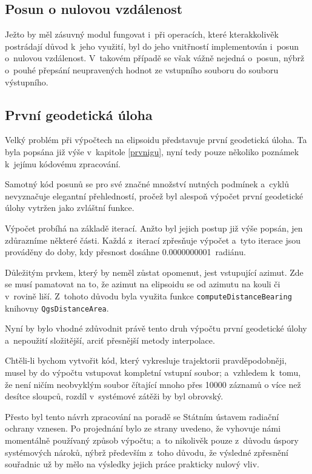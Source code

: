 \subsection{Posun o nulovou vzdálenost}
\label{nulovavzdalenost}

Ježto by měl zásuvný modul fungovat i~při
operacích, které kterakkolivěk postrádají důvod k~jeho využití, byl do jeho
vnitřností implementován i~posun o~nulovou vzdálenost.
V~takovém případě se však vážně nejedná o~posun, nýbrž o~pouhé přepsání
neupravených hodnot ze vstupního souboru do souboru výstupního. 

\subsection{První geodetická úloha}
\label{prvniguplugin}

Velký problém při výpočtech na elipsoidu představuje první geodetická úloha. Ta byla popsána
již výše v~kapitole \ref{prvnigu}, nyní tedy pouze několiko poznámek k~jejímu kódovému zpracování. 

Samotný kód posunů se pro své značné množství nutných podmínek a~cyklů nevyznačuje
elegantní přehledností, pročež byl alespoň výpočet první geodetické úlohy vytržen jako zvláštní funkce.

Výpočet probíhá na základě iterací. Anžto byl jejich postup již výše popsán, jen zdůrazníme
některé části. Každá z~iterací zpřesňuje výpočet a~tyto iterace jsou prováděny do doby,
kdy přesnost dosáhne 0.0000000001~radiánu. 

Důležitým prvkem, který by neměl zůstat opomenut, jest vstupující azimut. Zde se musí pamatovat
na to, že azimut na elipsoidu se od azimutu na kouli či v~ro\-vině liší. Z~tohoto
důvodu byla využita funkce {\tt computeDistanceBearing} knihovny {\tt QgsDistanceArea}.

Nyní by bylo vhodné zdůvodnit právě tento druh výpočtu první geodetické úlohy a~nepoužití
složitější, arciť přesnější metody interpolace. 

Chtěli-li bychom vytvořit kód, který vykresluje trajektorii pravděpodobněji, mu\-sel by do
výpočtu vstupovat kompletní vstupní soubor; a~vzhledem k~tomu, že není ničím neobvyklým
soubor čítající mnoho přes 10000 záznamů o více než desítce sloupců, rozdíl v~systémové zátěži
by byl obrovský. 

Přesto byl tento návrh zpraco\-vá\-ní na poradě se Státním ústavem radiační ochra\-ny
vznesen. Po projednání bylo ze strany  uvedeno, že vyhovuje námi momentálně
používaný způsob výpočtu; a~to nikolivěk pouze z~důvodu úspory systémových nároků, nýbrž především
z~toho důvodu, že výsledné zpřesnění souřadnic už by mělo na výsledky jejich práce
prakticky nulový vliv. 


